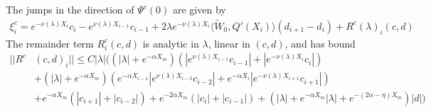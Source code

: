 \documentclass[thesis.tex]{subfiles}
\begin{document}
\begin{lemma}\label{jumpcenteradj}
The jumps in the direction of $\Psi^c(0)$ are given by
\begin{equation}\label{xic}
\begin{aligned}
\xi^c_i = e^{-\nu(\lambda) X_i} c_i - e^{\nu(\lambda) X_{i-1}} c_{i-1} + 2 \lambda e^{-\nu(\lambda)X_i} \langle \tilde{W}_0, Q'(X_i) \rangle (d_{i+1} - d_i )  + R^c(\lambda)_i(c, d)
\end{aligned}
\end{equation}
The remainder term $R^c_i(c, d)$ is analytic in $\lambda$, linear in $(c, d)$, and has bound
\begin{align*}
||R^c&(c, d)_i|| \leq C |\lambda| \Big(
(|\lambda| + e^{-\alpha X_m})(|e^{\nu(\lambda)X_{i-1}}c_{i-1}| + |e^{-\nu(\lambda)X_i}c_i|) \\
&+ (|\lambda| + e^{-\alpha X_m})( e^{-\alpha X_{i-1}} |e^{\nu(\lambda)X_{i-2}}c_{i-2}| + e^{-\alpha X_i} |e^{-\nu(\lambda)X_{i+1}}c_{i+1}|)  \\
&+ e^{-\alpha X_m}(|c_{i+1}|+|c_{i-2}|) + e^{-2 \alpha X_m}(|c_i|+|c_{i-1}|) + (|\lambda| + e^{-\alpha X_m}|\lambda| + e^{-(2 \alpha - \eta) X_m })|d|
\Big)
\end{align*}


\end{lemma}
\end{document}
